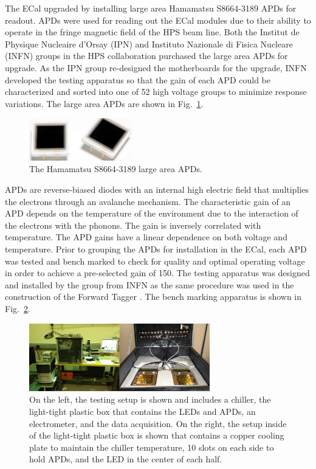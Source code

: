 The ECal upgraded by installing large area Hamamatsu S8664-3189 APDs for readout. APDs were used for reading out the ECal modules due to their ability to operate in the fringe magnetic field of the HPS beam line. Both the Institut de Physique Nucleaire d'Orsay (IPN) and Instituto Nazionale di Fisica Nucleare (INFN) groups in the HPS collaboration purchased the large area APDs for upgrade. As the IPN group re-designed the motherboards for the upgrade, INFN developed the testing apparatus so that the gain of each APD could be characterized and sorted into one of 52 high voltage groups to minimize response variations. The large area APDs are shown in Fig.~\ref{Figure:apd}.

\begin{figure}[h]
  \centering
      \includegraphics[width=0.4\textwidth]{pics/experiment/apd.png}
  \caption[Hamamatsu S8664-3189 large area APDs]{The Hamamatsu S8664-3189 large area APDs.}
  \label{Figure:apd}
\end{figure}

APDs are reverse-biased diodes with an internal high electric field that multiplies the electrons through an avalanche mechanism.  The characteristic gain of an APD depends on the temperature of the environment due to the interaction of the electrons with the phonons. The gain is inversely correlated with temperature.  The APD gains have a linear dependence on both voltage and temperature. Prior to grouping the APDs for installation in the ECal, each APD was tested and bench marked to check for quality and optimal operating voltage in order to achieve a pre-selected gain of 150. The testing apparatus was designed and installed by the group from INFN as the same procedure was used in the construction of the Forward Tagger \cite{celentano_2014}. The bench marking apparatus is shown in Fig.~\ref{Figure:apdtest}.

\begin{figure}[h]
  \centering
      \includegraphics[width=0.7\textwidth]{pics/experiment/apdtests.png}
  \caption[Testing assembly for large area APDs]{On the left, the testing setup is shown and includes a chiller, the light-tight plastic box that contains the LEDs and APDs, an electrometer, and the data acquisition. On the right, the setup inside of the light-tight plastic box is shown that contains a copper cooling plate to maintain the chiller temperature, 10 slots on each side to hold APDs, and the LED in the center of each half.}
  \label{Figure:apdtest}
\end{figure}

